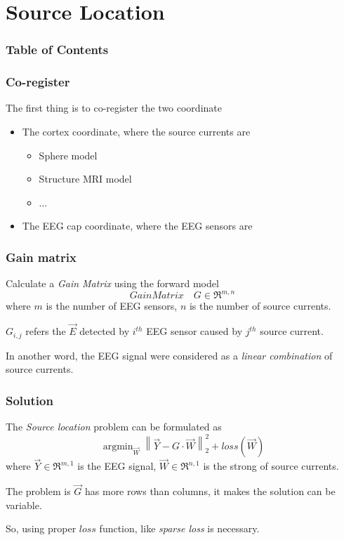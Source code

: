 \documentclass{beamer}
\begin{document}
\section{Source Location}

\begin{frame}
    \frametitle{Table of Contents}
    \tableofcontents[currentsection]
\end{frame}

\begin{frame}
    \frametitle{Co-register}
    The first thing is to co-register the two coordinate
    \begin{itemize}
        \item The cortex coordinate, where the source currents are
        \begin{itemize}
            \item Sphere model
            \item Structure MRI model
            \item $\dots$
        \end{itemize}
        \item The EEG cap coordinate, where the EEG sensors are
    \end{itemize}
\end{frame}

\begin{frame}
    \frametitle{Gain matrix}
    Calculate a \emph{Gain Matrix} using the forward model
    \begin{equation}
        Gain Matrix \quad G \in \mathfrak{R}^{m, n}
    \end{equation}
    where $m$ is the number of EEG sensors, $n$ is the number of source currents.

    $G_{i, j}$ refers the $\vec{E}$ detected by $i^{th}$ EEG sensor caused by $j^{th}$ source current.

    In another word, the EEG signal were considered as a \emph{linear combination} of source currents.
\end{frame}

\begin{frame}
    \frametitle{Solution}
    The \emph{Source location} problem can be formulated as
    \begin{equation}
        \mathop{\arg\min}_{\vec{W}}
        \left\lVert {\vec{Y} - G \cdot \vec{W}} \right\rVert ^{2} _{2} + loss(\vec{W})
    \end{equation}
    where $\vec{Y} \in \mathfrak{R}^{m, 1}$ is the EEG signal, $\vec{W} \in \mathfrak{R}^{n, 1}$ is the strong of source currents.

    The problem is $\vec{G}$ has more rows than columns, it makes the solution can be variable.

    So, using proper $loss$ function, like \emph{sparse loss} is necessary.
\end{frame}
\end{document}
